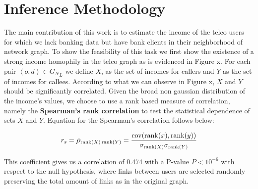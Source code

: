\section{Inference Methodology}






The main contribution of this work is to estimate the income of the telco users for which we lack banking data but have bank clients in their neighborhood of network graph. To show the feasibility of this task we first show the existence of a strong income homophily in the telco graph as is evidenced in Figure x. For each pair \( \left< o, d \right> \in {G_N}_L \) we define \( X \), as the set of incomes for callers and \( Y \) as the set of incomes for callees. According to what we can observe in Figure x, \( X \) and \( Y \) should be significantly correlated. Given the broad non gaussian distribution of the income's values, we choose to use a rank based measure of correlation, namely the \textbf{Spearman's rank correlation} to test the statistical dependence of sets \( X \) and \( Y \). Equation for the Spearman's correlation follows below: 

\[
r_s = \mathlarger{\rho}_{\operatorname{rank}(X) \operatorname{rank}(Y)} = \frac{\operatorname{cov}(\operatorname{rank}(x), \operatorname{rank}(y))}{\sigma_{\operatorname{rank}(X)} \sigma_{\operatorname{rank}(Y)}}
\]

This coefficient gives us a correlation of \num{0.474} with a P-value $ P < 10^{-6} $  with respect to the null hypothesis, where links between users are selected randomly preserving the total amount of links as in the original graph.

